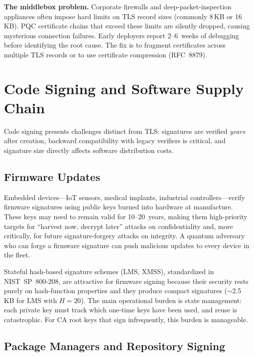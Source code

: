\begin{svgraybox}
\textbf{The middlebox problem.}  Corporate firewalls and deep-packet-inspection appliances often impose hard limits on TLS record sizes (commonly 8\,KB or 16\,KB).  PQC certificate chains that exceed these limits are silently dropped, causing mysterious connection failures.  Early deployers report 2--6~weeks of debugging before identifying the root cause.  The fix is to fragment certificates across multiple TLS records or to use certificate compression (RFC~8879).
\end{svgraybox}


\section{Code Signing and Software Supply Chain}
\label{sec:code-signing}

Code signing presents challenges distinct from TLS: signatures are verified \emph{years} after creation, backward compatibility with legacy verifiers is critical, and signature size directly affects software distribution costs.

\subsection{Firmware Updates}
\label{subsec:firmware}

Embedded devices---IoT sensors, medical implants, industrial controllers---verify firmware signatures using public keys burned into hardware at manufacture.  These keys may need to remain valid for 10--20~years, making them high-priority targets for ``harvest now, decrypt later'' attacks on confidentiality and, more critically, for future signature-forgery attacks on integrity.  A quantum adversary who can forge a firmware signature can push malicious updates to every device in the fleet.

Stateful hash-based signature schemes (LMS, XMSS), standardized in NIST~SP~800-208, are attractive for firmware signing because their security rests purely on hash-function properties and they produce compact signatures ($\sim$2.5\,KB for LMS with $H=20$).  The main operational burden is state management: each private key must track which one-time keys have been used, and reuse is catastrophic.  For CA root keys that sign infrequently, this burden is manageable.

\subsection{Package Managers and Repository Signing}
\label{subsec:package-managers}

